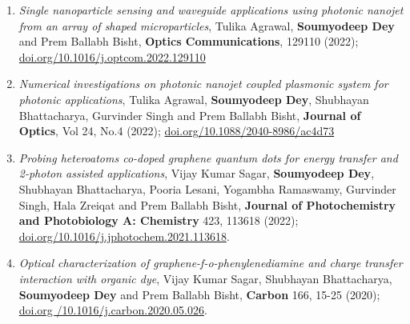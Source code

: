 \documentclass[11pt,a4paper,sans]{moderncv}        %
\begin{document}
\begin{enumerate}
	\item{\emph{Single nanoparticle sensing and waveguide applications using photonic nanojet from an array of shaped microparticles}, Tulika Agrawal, \textbf{Soumyodeep Dey} and Prem Ballabh Bisht, \textbf{Optics Communications}, 129110 (2022); \href{https://doi.org/10.1016/j.optcom.2022.129110}{\color{blue}doi.org/10.1016/j.optcom.2022.129110}}
		
	\vspace{6pt}
	
	\item{\emph{Numerical investigations on photonic nanojet coupled plasmonic system for photonic applications}, Tulika Agrawal, \textbf{Soumyodeep Dey}, Shubhayan Bhattacharya, Gurvinder Singh and Prem Ballabh Bisht, \textbf{Journal of Optics}, Vol 24, No.4 (2022); \href{https://doi.org/10.1088/2040-8986/ac4d73}{\color{blue}doi.org/10.1088/2040-8986/ac4d73}}
	
	\vspace{6pt}
	
	\item{\emph{Probing heteroatoms co-doped graphene quantum dots for energy transfer and 2-photon assisted applications}, Vijay Kumar Sagar, \textbf{Soumyodeep Dey}, Shubhayan Bhattacharya, Pooria Lesani, Yogambha Ramaswamy, Gurvinder Singh, Hala Zreiqat and Prem Ballabh Bisht, \textbf{Journal of Photochemistry and Photobiology A: Chemistry} 423, 113618 (2022); \href{https://doi.org/10.1016/j.jphotochem.2021.113618}{\color{blue}doi.org/10.1016/j.jphotochem.2021.113618}.}
	
	\vspace{6pt}
	
	\item{\emph{Optical characterization of graphene-f-o-phenylenediamine and charge transfer interaction with organic dye}, Vijay Kumar Sagar, Shubhayan Bhattacharya, \textbf{Soumyodeep Dey} and Prem Ballabh Bisht, \textbf{Carbon} 166, 15-25 (2020); \href{doi.org /10.1016/j.carbon.2020.05.026}{\color{blue}doi.org /10.1016/j.carbon.2020.05.026}.}
	
	\vspace{6pt}
		
\end{enumerate}
\end{document}

